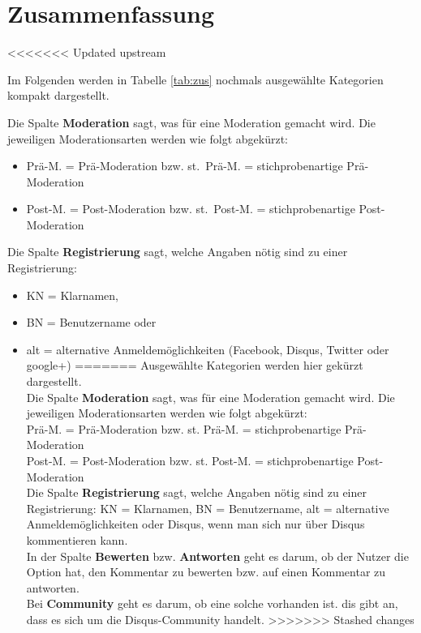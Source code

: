 \section{Zusammenfassung}
<<<<<<< Updated upstream

Im Folgenden werden in Tabelle \ref{tab:zus} nochmals ausgewählte Kategorien kompakt dargestellt.

Die Spalte {\bfseries Moderation} sagt, was für eine Moderation gemacht wird.
Die jeweiligen Moderationsarten werden wie folgt abgekürzt:
\begin{itemize}
  \item Prä-M. = Prä-Moderation bzw. st.~Prä-M. = stichprobenartige Prä-Moderation
  \item Post-M. = Post-Moderation bzw. st.~Post-M. = stichprobenartige Post-Moderation
\end{itemize}

Die Spalte {\bfseries Registrierung} sagt, welche Angaben nötig sind zu einer Registrierung:

\begin{itemize}
  \item KN = Klarnamen,
  \item BN = Benutzername oder
  \item alt = alternative Anmeldemöglichkeiten (Facebook, Disqus, Twitter oder google+)
=======
Ausgewählte Kategorien werden hier gekürzt 
dargestellt.\\
Die Spalte {\bf Moderation} sagt, was für eine Moderation gemacht wird.
Die jeweiligen Moderationsarten werden wie folgt abgekürzt:\\
Prä-M. = Prä-Moderation bzw. st. Prä-M. = stichprobenartige Prä-Moderation\\
Post-M. = Post-Moderation bzw. st. Post-M. = stichprobenartige Post-Moderation\\
Die Spalte {\bf Registrierung} sagt, welche Angaben nötig sind zu einer Registrierung: KN = Klarnamen, BN = Benutzername, alt = alternative Anmeldemöglichkeiten oder Disqus, wenn man sich nur über Disqus kommentieren kann.\\
In der Spalte {\bf Bewerten} bzw. {\bf Antworten} geht es darum, ob der Nutzer die Option hat, den Kommentar zu bewerten bzw. auf einen 
Kommentar zu antworten. \\
Bei {\bf Community} geht es darum, ob eine solche vorhanden ist. dis gibt an, dass es sich um die Disqus-Community handelt. 
>>>>>>> Stashed changes
\end{itemize}

